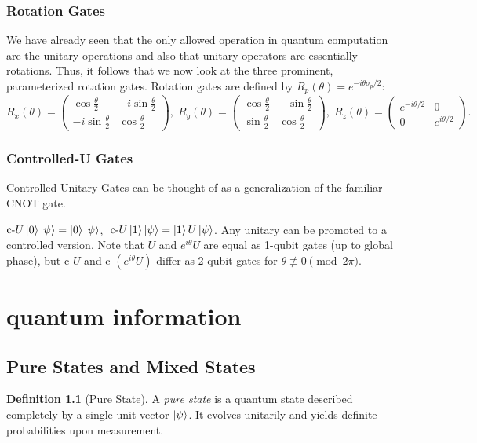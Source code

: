 \documentclass[12pt, a4paper, oneside]{report}
\theoremstyle{plain}
\theoremstyle{definition}
\newtheorem{definition}[theorem]{Definition}
\theoremstyle{remark}
\newcommand{\cU}{\mathrm{c}\text{-}U}
\newcommand{\Rx}{R_x}
\newcommand{\Ry}{R_y}
\newcommand{\Rz}{R_z}
\begin{document}
\subsection{Rotation Gates}
We have already seen that the only allowed operation in quantum computation are the unitary operations and also that unitary operators are essentially rotations. Thus, it follows that we now look at the three prominent, parameterized rotation gates.
Rotation gates are defined by $R_p(\theta) = e^{-i\theta\sigma_p/2}$:
\[
  \Rx(\theta) = \begin{pmatrix}\cos\frac{\theta}{2} & -i\sin\frac{\theta}{2}\\
  -i\sin\frac{\theta}{2} & \cos\frac{\theta}{2}\end{pmatrix},\;
  \Ry(\theta) = \begin{pmatrix}\cos\frac{\theta}{2} & -\sin\frac{\theta}{2}\\
  \sin\frac{\theta}{2} & \cos\frac{\theta}{2}\end{pmatrix},\;
  \Rz(\theta) = \begin{pmatrix}e^{-i\theta/2} & 0\\ 0 & e^{i\theta/2}\end{pmatrix}.
\]

\subsection{Controlled-U Gates}

Controlled Unitary Gates can be thought of as a generalization of the familiar CNOT gate. 

$\cU\ket{0}\ket{\psi} = \ket{0}\ket{\psi}$, $\;\cU\ket{1}\ket{\psi} = \ket{1}U\ket{\psi}$.
Any unitary can be promoted to a controlled version. Note that $U$ and $e^{i\theta}U$ are
equal as 1-qubit gates (up to global phase), but $\cU$ and $\mathrm{c}\text{-}(e^{i\theta}U)$
differ as 2-qubit gates for $\theta \not\equiv 0 \pmod{2\pi}$.


\chapter{quantum information}

\section{Pure States and Mixed States}

\begin{definition}[Pure State]
A \emph{pure state} is a quantum state described completely by a single unit vector
$\ket{\psi}$. It evolves unitarily and yields definite probabilities upon measurement.
\end{definition}
\end{document}
